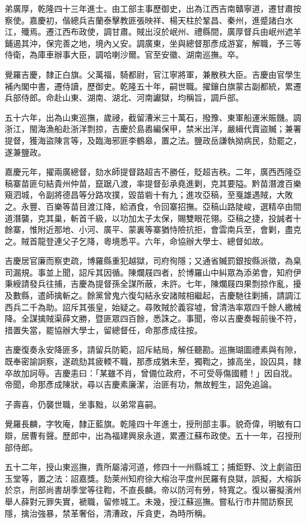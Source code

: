 \begin{pinyinscope}
弟廣厚，乾隆四十三年進士。由工部主事歷御史，出為江西吉南贛寧道，遷甘肅按察使。嘉慶初，偕總兵吉蘭泰擊教匪張映祥、楊天柱於鞏昌、秦州，進蹙諸白水江，殲焉。遷江西布政使，調甘肅。賊出沒於岷州、禮縣間，廣厚督兵由岷州遮羊鋪遏其沖，保完善之地，境內乂安。調廣東，坐與總督那彥成游宴，解職，予三等侍衛，為庫車辦事大臣，調哈喇沙爾。官至安徽、湖南巡撫。卒。

覺羅吉慶，隸正白旗。父萬福，騎都尉，官江寧將軍，兼散秩大臣。吉慶由官學生補內閣中書，遷侍讀，歷御史。乾隆五十年，嗣世職。擢鑲白旗蒙古副都統，累遷兵部侍郎。命赴山東、湖南、湖北、河南讞獄，均稱旨，調戶部。

五十六年，出為山東巡撫，歲祲，截留漕米三十萬石，撥豫、東軍船運米賑饑。調浙江，閩海漁船赴浙洋剽掠，吉慶於島嶴編保甲，禁米出洋，嚴緝代賣盜贓；兼署提督，獲海盜陳言等，及臨海邪匪李鶴皋，置之法。鹽政岳謙執拗病民，劾罷之，遂兼鹽政。

嘉慶元年，擢兩廣總督，劾水師提督路超吉不勝任，貶超吉秩。二年，廣西西隆亞稿寨苗匪句結貴州仲苗，竄踞八渡，率提督彭承堯進剿，克其要隘。黔苗潛渡百樂窺泗城，令副將德昌等分路攻撲，毀苗砦十有九；進攻亞稿，至戛雄遇賊，大敗之。永豐、百樂等苗目渡江降，給酒食，令回寨招撫。亞稿山路陡峻，選精卒由間道潛襲，克其巢，斬首千級，以功加太子太保，賜雙眼花翎。亞稿之捷，投誠者十餘寨，惟附近那地、小河、廣平、蒙裏等寨猶恃險抗拒，會雲南兵至，會剿，盡克之。賊首龍登連父子乞降，粵境悉平。六年，命協辦大學士、總督如故。

吉慶居官廉而察吏疏，博羅縣重犯越獄，司府徇隱；又通省贓罰銀按縣派徵，為臬司漏規。事並上聞，詔斥其因循。陳爛屐四者，於博羅山中糾眾為添弟會，知府伊秉綬請發兵往捕，吉慶為提督孫全謀所蔽，未許。七年，陳爛屐四果剽掠作亂，擾及數縣，遣師擒斬之。餘黨曾鬼六復勾結永安諸賊相繼起，吉慶馳往剿捕，請調江西兵二千為助。詔斥其張皇，始疑之。尋敗賊於義容墟，曾清浩率眾四千餘人繳械降。全謀擒賊渠薛文勝，暨匪眾四百餘，悉誅之。事聞，帝以吉慶奏報前後不符，措置失當，罷協辦大學士，留總督任，命那彥成往按。

吉慶復奏永安降匪多，請留兵防範，詔斥結局，解任聽勘。巡撫瑚圖禮素與有隙，既奉密諭詗察，遂疏劾其疲輭不職，那彥成猶未至，獨鞫之，據高坐，設囚具，隸卒故加訶辱。吉慶恚曰：「某雖不肖，曾備位政府，不可受辱傷國體！」因自戕。帝聞，命那彥成陳狀，尋以吉慶素廉潔，治匪有功，無故輕生，詔免追論。

子壽喜，仍襲世職，坐事黜，以弟常喜嗣。

覺羅長麟，字牧庵，隸正藍旗。乾隆四十年進士，授刑部主事。貌奇偉，明敏有口辯，居曹有聲。歷郎中，出為福建興泉永道，累遷江蘇布政使。五十一年，召授刑部侍郎。

五十二年，授山東巡撫，責所屬濬河道，修四十一州縣城工；捕鉅野、汶上劇盜田玉堂等，置之法：詔嘉獎。劾萊州知府徐大榕治平度州民羅有良獄，誤擬，大榕訴於京，刑部尚書胡季堂等往鞫，不直長麟。帝以防河有勞，特寬之。復以審擬濱州舉人薛對元罪失實，褫職，留修城工。未幾，授江蘇巡撫。嘗私行市井間訪察民隱，擒治強暴，禁革奢俗，清漕政，斥貪吏，為時所稱。


\end{pinyinscope}
